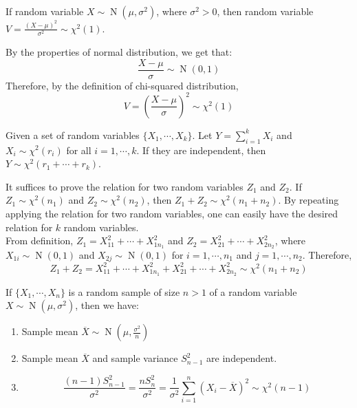 \documentclass{huhtakm-template-book-v2}
\DeclareMathOperator{\N}{N}
\begin{document}
\begin{thm}
	\label{Chapter 1 (Theorem) chi-square distribution with 1 degree of freedom}
	If random variable $X\sim\N(\mu,\sigma^{2})$, where $\sigma^{2}>0$, then random variable $V=\frac{(X-\mu)^{2}}{\sigma^{2}}\sim\chi^{2}(1)$.
\end{thm}
\begin{proofing}
	By the properties of normal distribution, we get that:
	\begin{equation*}
		\frac{X-\mu}{\sigma}\sim\N(0,1)
	\end{equation*}
	Therefore, by the definition of chi-squared distribution,
	\begin{equation*}
		V=\left(\frac{X-\mu}{\sigma}\right)^{2}\sim\chi^{2}(1)
	\end{equation*}
\end{proofing}
\begin{thm}
	Given a set of random variables $\{X_{1},\cdots,X_{k}\}$. Let $Y=\sum_{i=1}^{k}X_{i}$ and $X_{i}\sim\chi^{2}(r_{i})$ for all $i=1,\cdots,k$. If they are independent, then $Y\sim\chi^{2}(r_{1}+\cdots+r_{k})$.
\end{thm}
\begin{proofing}
	It suffices to prove the relation for two random variables $Z_{1}$ and $Z_{2}$. If $Z_{1}\sim\chi^{2}(n_{1})$ and $Z_{2}\sim\chi^{2}(n_{2})$, then $Z_{1}+Z_{2}\sim\chi^{2}(n_{1}+n_{2})$. By repeating applying the relation for two random variables, one can easily have the desired relation for $k$ random variables.\\
	From definition, $Z_{1}=X_{11}^{2}+\cdots+X_{1n_{1}}^{2}$ and $Z_{2}=X_{21}^{2}+\cdots+X_{2n_{2}}^{2}$, where $X_{1i}\sim\N(0,1)$ and $X_{2j}\sim\N(0,1)$ for $i=1,\cdots,n_{1}$ and $j=1,\cdots,n_{2}$. Therefore,
	\begin{equation*}
		Z_{1}+Z_{2}=X_{11}^{2}+\cdots+X_{1n_{1}}^{2}+X_{21}^{2}+\cdots+X_{2n_{2}}^{2}\sim\chi^{2}(n_{1}+n_{2})
	\end{equation*}
\end{proofing}
\begin{thm}
	\label{Chapter 1 (Theorem) Normal and chi-squared distribution related to sample mean and variance}
	If $\{X_{1},\cdots,X_{n}\}$ is a random sample of size $n>1$ of a random variable $X\sim\N(\mu,\sigma^{2})$, then we have:
	\begin{enumerate}
		\item Sample mean $\overline{X}\sim\N(\mu,\frac{\sigma^{2}}{n})$
		\item Sample mean $\overline{X}$ and sample variance $S_{n-1}^{2}$ are independent.
		\item 
		\begin{equation*}
			\frac{(n-1)S_{n-1}^{2}}{\sigma^{2}}=\frac{nS_{n}^{2}}{\sigma^{2}}=\frac{1}{\sigma^{2}}\sum_{i=1}^{n}(X_{i}-\overline{X})^{2}\sim\chi^{2}(n-1)
		\end{equation*}
	\end{enumerate}
\end{thm}
\end{document}
